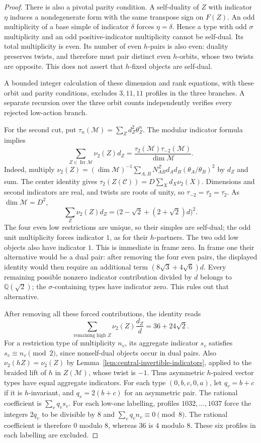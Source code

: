 \begin{proof}
There is also a pivotal parity condition. A self-duality of $Z$ with
indicator $\eta$ induces a nondegenerate form with the same transpose
sign on $F(Z)$. An odd multiplicity of a base simple of indicator
$\delta$ forces $\eta=\delta$. Hence a type with odd $\sigma$ multiplicity
and an odd positive-indicator multiplicity cannot be self-dual.
Its total multiplicity is even. Its number of even $h$-pairs is also
even: duality preserves twists, and therefore must pair distinct even
$h$-orbits, whose two twists are opposite. This does not assert that
$h$-fixed objects are self-dual.

A bounded integer calculation of these dimension and rank equations,
with these orbit and parity conditions, excludes $3,11,11$ profiles in
the three branches. A separate recursion over the three orbit counts
independently verifies every rejected low-action branch.

For the second cut, put $\tau_n(\mathcal M)=\sum_Zd_Z^2\theta_Z^n$.
The modular indicator formula \cite[Theorem~7.5]{NS} implies
\[
 \sum_{Z\in\operatorname{Irr}\mathcal M}\nu_2(Z)d_Z
    =\frac{\tau_2(\mathcal M)\tau_{-2}(\mathcal M)}{\dim\mathcal M}.
\]
Indeed, multiply
$\nu_2(Z)=(\dim\mathcal M)^{-1}
\sum_{A,B}N_{AB}^{Z}d_A d_B(\theta_A/\theta_B)^2$
by $d_Z$ and sum. The center identity \cite[Theorem~4.1]{NS} gives
$\tau_2(Z(\mathcal C))=D\sum_Xd_X\nu_2(X)$. Dimensions and second
indicators are real, and twists are roots of unity, so
$\tau_{-2}=\overline{\tau_2}=\tau_2$. As $\dim\mathcal M=D^2$,
\[
 \sum_Z\nu_2(Z)d_Z
   =\bigl(2-\sqrt2+(2+\sqrt2)d\bigr)^2.
\]
The four even low restrictions are unique, so their simples are self-dual;
the odd unit multiplicity forces indicator $1$, as for their $h$-partners.
The two odd low objects also have indicator
$1$. This is immediate in frame zero. In frame one their alternative
would be a dual pair: after removing the four even pairs, the displayed identity would
then require an additional term $(8\sqrt3+4\sqrt6)d$. Every remaining
possible nonzero indicator contribution divided by $d$ belongs to
$\mathbb Q(\sqrt2)$; the $\sigma$-containing types have indicator zero.
This rules out that alternative.

After removing all these forced contributions, the identity reads
\[
 \sum_{\text{remaining high }Z}\nu_2(Z)\frac{d_Z}{d}
      =36+24\sqrt2.
\]
For a restriction type of multiplicity $n_v$, its aggregate indicator
$s_v$ satisfies $s_v\equiv n_v\pmod2$, since nonself-dual objects occur in dual
pairs. Also $\nu_2(hZ)=\nu_2(Z)$ by
Lemma~\ref{lem:central-invertible-indicators}, applied to the braided
lift of $h$ in $Z(\mathcal M)$, whose twist is $-1$.
Thus asymmetric $h$-paired vector types have equal aggregate indicators.
For each type $(0,b,c,0,a)$, let $q_v=b+c$ if it is $h$-invariant,
and $q_v=2(b+c)$ for an asymmetric pair. The rational coefficient is
$\sum_v q_vs_v$.
For each low-one labelling, profiles $1032,\ldots,1037$ force the
integers $2q_v$ to be divisible by $8$ and
$\sum_vq_vn_v\equiv0\pmod8$. The rational coefficient is therefore
$0$ modulo $8$, whereas
$36$ is $4$ modulo $8$. These six profiles in each labelling are excluded.


\end{proof}
